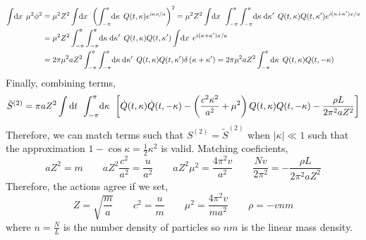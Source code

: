 \documentclass[12pt]{extarticle}
\begin{document}
\begin{align*}
\int \! \d{x} \: \mu^2 \phi^2 & = \mu^2 Z^2 \int \! \d{x} \: \left( \int_{-\pi}^{\pi} \! \d{\kappa} \: Q(t, \kappa) e^{i \kappa x / a} \right)^2 = \mu^2 Z^2 \int \! \d{x} \:\int_{-\pi}^{\pi} \int_{-\pi}^{\pi} \! \d{\kappa} \d{\kappa'} \: Q(t, \kappa) Q(t, \kappa') e^{i (\kappa + \kappa') x / a} \\
& = \mu^2 Z^2 \int_{-\pi}^{\pi} \int_{-\pi}^{\pi} \! \d{\kappa} \d{\kappa'} \: Q(t, \kappa) Q(t, \kappa') \int \! \d{x} \: e^{i (\kappa + \kappa') x / a} \\
& = 2 \pi \mu^2 a Z^2  \int_{-\pi}^{\pi} \int_{-\pi}^{\pi} \! \d{\kappa} \d{\kappa'} \: Q(t, \kappa) Q(t, \kappa') \delta\left( \kappa + \kappa' \right) = 2 \pi \mu^2 a Z^2 \int_{-\pi}^{\pi} \! \d{\kappa} \: Q(t, \kappa) Q(t, -\kappa) 
\end{align*}
Finally, combining terms,
\begin{align*}
\tilde{S}^{(2)} = \pi a Z^2 \int \mathrm{d}t \: \: \int_{-\pi}^{\pi} \! \mathrm{d}\kappa \: \:\left[  \dot{Q}(t, \kappa) \dot{Q}(t, -\kappa) - \left(\frac{c^2 \kappa^2}{a^2} + \mu^2 \right) Q(t, \kappa) Q(t, -\kappa) - \frac{\rho L}{2 \pi^2 a Z^2} \right]
\end{align*}
Therefore, we can match terms such that $S^{(2)} = \tilde{S}^{(2)}$ when $|\kappa| \ll 1$ such that the approximation $1 - \cos{\kappa} = \tfrac{1}{2} \kappa^2$ is valid. Matching coeficients,
\[ aZ^2 = m \quad \quad a Z^2 \frac{c^2}{a^2} = \frac{u}{a^2} \quad \quad a Z^2 \mu^2 = \frac{4 \pi^2 v}{a^2} \quad \quad \frac{N v}{2 \pi^2} = - \frac{\rho L}{2 \pi^2 a Z^2}\]
Therefore, the actions agree if we set,
\[Z = \sqrt{\frac{m}{a}} \quad \quad c^2 = \frac{u}{m} \quad \quad \mu^2 = \frac{4 \pi^2 v}{m a^2} \quad \quad \rho = - v n m\] 
where $n = \frac{N}{L}$ is the number density of particles so $n m$ is the linear mass density. 
\end{document}

